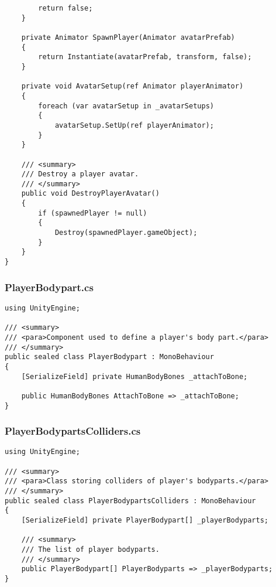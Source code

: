 \begin{verbatim}
        return false;
    }

    private Animator SpawnPlayer(Animator avatarPrefab)
    {
        return Instantiate(avatarPrefab, transform, false);
    }

    private void AvatarSetup(ref Animator playerAnimator)
    {
        foreach (var avatarSetup in _avatarSetups)
        {
            avatarSetup.SetUp(ref playerAnimator);
        }
    }

    /// <summary>
    /// Destroy a player avatar.
    /// </summary>
    public void DestroyPlayerAvatar()
    {
        if (spawnedPlayer != null)
        {
            Destroy(spawnedPlayer.gameObject);
        }
    }
}
\end{verbatim}
\subsubsection*{PlayerBodypart.cs}
\begin{verbatim}
using UnityEngine;

/// <summary>
/// <para>Component used to define a player's body part.</para>
/// </summary>
public sealed class PlayerBodypart : MonoBehaviour
{
    [SerializeField] private HumanBodyBones _attachToBone;

    public HumanBodyBones AttachToBone => _attachToBone;
}
\end{verbatim}
\subsubsection*{PlayerBodypartsColliders.cs}
\begin{verbatim}
using UnityEngine;

/// <summary>
/// <para>Class storing colliders of player's bodyparts.</para>
/// </summary>
public sealed class PlayerBodypartsColliders : MonoBehaviour
{
    [SerializeField] private PlayerBodypart[] _playerBodyparts;

    /// <summary>
    /// The list of player bodyparts.
    /// </summary>
    public PlayerBodypart[] PlayerBodyparts => _playerBodyparts;
}
\end{verbatim}

